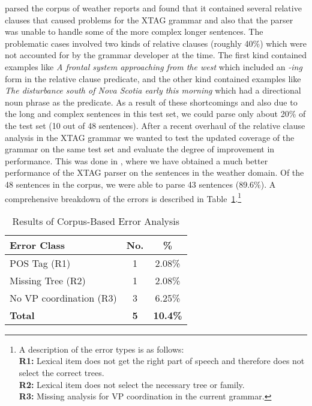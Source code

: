 \cite{c.97:_maint_xtag} parsed the corpus of weather reports and found that
it contained several relative clauses that caused problems for the XTAG
grammar and also that the parser was unable to handle some of the more
complex longer sentences. The problematic cases involved two kinds of
relative clauses (roughly 40\%) which were not accounted for by the grammar
developer at the time. The first kind contained examples like {\em A
frontal system approaching from the west} which included an {\em -ing} form
in the relative clause predicate, and the other kind contained examples
like {\it The disturbance south of Nova Scotia early this morning} which
had a directional noun phrase as the predicate. As a result of these
shortcomings and also due to the long and complex sentences in this test
set, we could parse only about 20\% of the test set (10 out of 48
sentences).  After a recent overhaul of the relative clause analysis in the
XTAG grammar we wanted to test the updated coverage of the grammar on
the same test set and evaluate the degree of improvement in performance.
This was done in \cite{prasadandsarkar00}, where we have obtained a much
better performance of the XTAG parser on the sentences in the weather
domain. Of the 48 sentences in the corpus, we were able to parse 43
sentences (89.6\%). A comprehensive breakdown of the errors is described in
Table~\ref{tab:weather_analysis}.\footnote{%
%
A description of the error types is as follows:\\
{\bf R1:} Lexical item does not get the right part of speech and therefore
does not select the correct trees.\\
{\bf R2:} Lexical item does not select the necessary tree or family.\\
{\bf R3:} Missing analysis for VP coordination in the current grammar.%
%
}

\begin{table}[htb]
\centering
\begin{tabular}{|l|c|c|} \hline \hline
Error Class & No. & \% \\ \hline \hline
POS Tag (R1) & 1 & 2.08\% \\ \hline
Missing Tree (R2) & 1 & 2.08\% \\ \hline
No VP coordination (R3) & 3 & 6.25\% \\ \hline
{\bf Total} & {\bf 5} & {\bf 10.4\%} \\ \hline
\end{tabular}
\caption{\label{tab:weather_analysis} Results of Corpus-Based Error Analysis}
\end{table}


